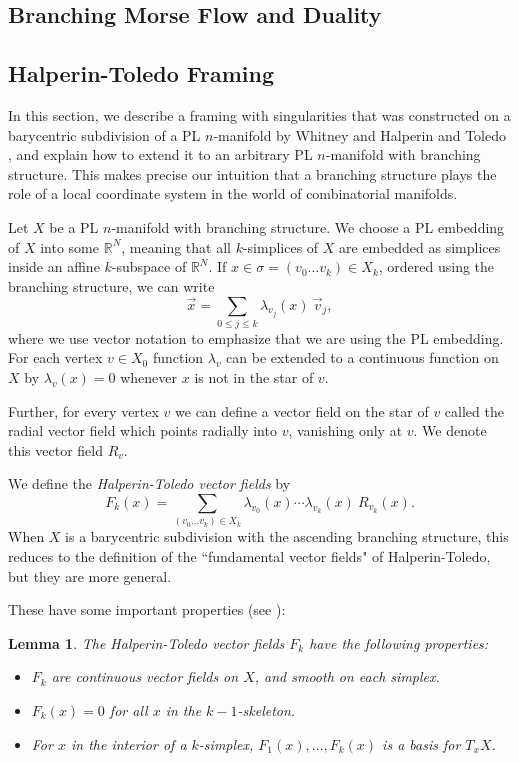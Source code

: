 \documentclass{article}
\newtheorem{lemma}{Lemma}
\theoremstyle{definition}
\begin{document}
\subsection{Branching Morse Flow and Duality}

\subsection{Halperin-Toledo Framing}

In this section, we describe a framing with singularities that was constructed on a barycentric subdivision of a PL $n$-manifold by Whitney \cite{whitneysphere} and Halperin and Toledo \cite{HalperinToledo}, and explain how to extend it to an arbitrary PL $n$-manifold with branching structure. This makes precise our intuition that a branching structure plays the role of a local coordinate system in the world of combinatorial manifolds.

Let $X$ be a PL $n$-manifold with branching structure. We choose a PL embedding of $X$ into some $\mathbb{R}^N$, meaning that all $k$-simplices of $X$ are embedded as simplices inside an affine $k$-subspace of $\mathbb{R}^N$. If $x \in \sigma = (v_0 \ldots v_k) \in X_k$, ordered using the branching structure, we can write
\[\vec x = \sum_{0 \le j \le k} \lambda_{v_j}(x)\ \vec v_j,\]
where we use vector notation to emphasize that we are using the PL embedding. For each vertex $v \in X_0$ function $\lambda_v$ can be extended to a continuous function on $X$ by $\lambda_v(x) = 0$ whenever $x$ is not in the star of $v$.

Further, for every vertex $v$ we can define a vector field on the star of $v$ called the radial vector field which points radially into $v$, vanishing only at $v$. We denote this vector field $R_v$.

We define the \emph{Halperin-Toledo vector fields} by
\[F_k(x) = \sum_{(v_0\ldots v_k) \in X_k} \lambda_{v_0}(x) \cdots \lambda_{v_k}(x)\ R_{v_k}(x).\]
When $X$ is a barycentric subdivision with the ascending branching structure, this reduces to the definition of the ``fundamental vector fields" of Halperin-Toledo, but they are more general.

These have some important properties (see \cite{HalperinToledo}):
\begin{lemma} The Halperin-Toledo vector fields $F_k$ have the following properties:
\begin{itemize}
    \item $F_k$ are continuous vector fields on $X$, and smooth on each simplex.
    \item $F_k(x) = 0$ for all $x$ in the $k-1$-skeleton.
    \item For $x$ in the interior of a $k$-simplex, $F_1(x),\ldots,F_k(x)$ is a basis for $T_x X$.
\end{itemize}
\end{lemma}
\end{document}
